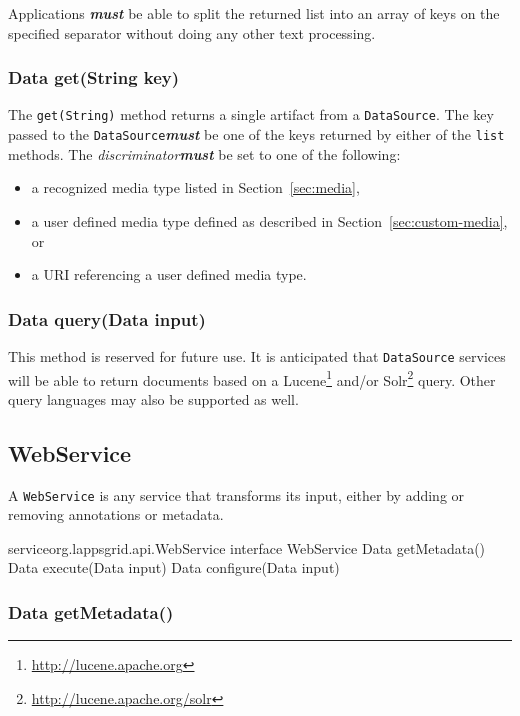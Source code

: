 \documentclass{article}
\newcommand{\source}{\texttt{DataSource}\xspace}
\newcommand{\service}{\texttt{WebService}\xspace}
\newcommand{\discriminator}{\textit{discriminator}\xspace}
\newcommand{\definedterm}[1]{\textbf{\textit{#1}}\xspace}
\newcommand{\must}{\definedterm{must}}
\renewcommand{\tt}[1]{\texttt{#1}}
\newenvironment{listing}{
\begin{itemize}
  \setlength{\itemsep}{1pt}
  \setlength{\parskip}{0pt}
  \setlength{\parsep}{0pt}
}{\end{itemize}}
\begin{document}
Applications \must be able to split the returned list into an array of keys on the specified separator without doing any other text processing.

\subsubsection{Data get(String key)}

The \tt{get(String)} method returns a single artifact from a \source.  The key passed to the \source \must be one of the keys returned by either of the \tt{list} methods. The \discriminator \must be set to one of the following:
\begin{listing}
\item a recognized media type listed in Section~\ref{sec:media},
\item a user defined media type defined as described in Section~\ref{sec:custom-media}, or
\item a URI referencing a user defined media type.
\end{listing}

\subsubsection{Data query(Data input)}

This method is reserved for future use.  It is anticipated that \source services will be able to return documents based on a Lucene\footnote{\url{http://lucene.apache.org}} and/or Solr\footnote{\url{http://lucene.apache.org/solr}} query.  Other query languages may also be supported as well.



\subsection{WebService}\label{sub:WebService}

A \service is any service that transforms its input, either by adding or removing annotations or metadata.

\begin{groovy}{service}{org.lappsgrid.api.WebService}
	interface WebService {
		Data getMetadata()
		Data execute(Data input)
		Data configure(Data input)
	}
\end{groovy}

\subsubsection{Data getMetadata()}
\end{document}
